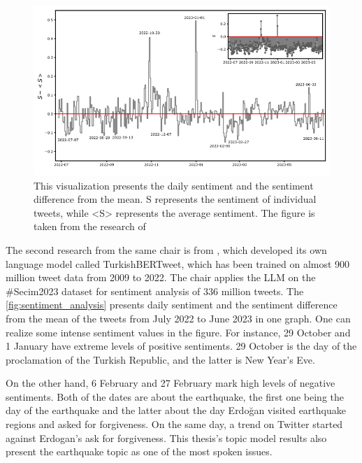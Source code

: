 \begin{figure}[h!]
    \centering
    \includegraphics[width=\linewidth]{figures/sentiment_plot.png}
    \caption[Daily Sentiment Analysis of the \#Secim2023 Dataset]
    {This visualization presents the daily sentiment and the sentiment difference from the mean. 
    S represents the sentiment of individual tweets, while <S> represents the average sentiment. 
    The figure is taken from the research of \textcite{turkishbertweet_2023}}\label{fig:sentiment_analysis}
\end{figure}

The second research from the same chair is from \textcite{turkishbertweet_2023}, which developed its 
own language model called TurkishBERTweet, which has been trained on almost 900 million tweet data 
from 2009 to 2022. The chair applies the LLM on the \#Secim2023 dataset for sentiment analysis of 
336 million tweets. The \autoref{fig:sentiment_analysis} presents daily sentiment and the sentiment 
difference from the mean of the tweets from July 2022 to June 2023 in one graph. One can realize some 
intense sentiment values in the figure. For instance, 29 October and 1 January have extreme levels of 
positive sentiments. 29 October is the day of the proclamation of the Turkish Republic, and the latter 
is New Year's Eve.

On the other hand, 6 February and 27 February mark high levels of negative sentiments. Both of the 
dates are about the earthquake, the first one being the day of the earthquake and the latter about 
the day Erdo­ğan visited earthquake regions and asked for forgiveness. On the same day, a trend on 
Twitter started against Erdogan's ask for forgiveness. This thesis's topic model results also present 
the earthquake topic as one of the most spoken issues.

